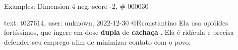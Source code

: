 \begin{frame}{Examples: Dimension 4 neg, score -2, \# 000030}
\footnotesize
\begin{alertblock}{text: t027614, user: unknown, 2022-12-30}
@Rconstantino Ela usa opióides fortíssimos, que ingere em dose \textbf{dupla} 
de \textbf{cachaça} . Ela é ridícula e precisa defender seu emprego afim de 
minimizar contato com o povo. 
\end{alertblock}
\end{frame}
